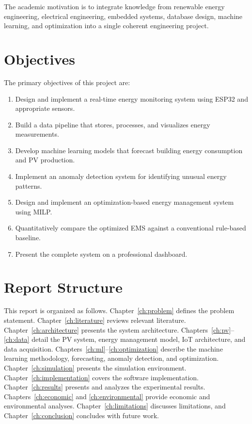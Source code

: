The academic motivation is to integrate knowledge from renewable energy engineering, electrical engineering, embedded systems, database design, machine learning, and optimization into a single coherent engineering project.

\section{Objectives}

The primary objectives of this project are:

\begin{enumerate}
    \item Design and implement a real-time energy monitoring system using ESP32 and appropriate sensors.
    \item Build a data pipeline that stores, processes, and visualizes energy measurements.
    \item Develop machine learning models that forecast building energy consumption and PV production.
    \item Implement an anomaly detection system for identifying unusual energy patterns.
    \item Design and implement an optimization-based energy management system using MILP.
    \item Quantitatively compare the optimized EMS against a conventional rule-based baseline.
    \item Present the complete system on a professional dashboard.
\end{enumerate}

\section{Report Structure}

This report is organized as follows. Chapter~\ref{ch:problem} defines the problem statement. Chapter~\ref{ch:literature} reviews relevant literature. Chapter~\ref{ch:architecture} presents the system architecture. Chapters~\ref{ch:pv}--\ref{ch:data} detail the PV system, energy management model, IoT architecture, and data acquisition. Chapters~\ref{ch:ml}--\ref{ch:optimization} describe the machine learning methodology, forecasting, anomaly detection, and optimization. Chapter~\ref{ch:simulation} presents the simulation environment. Chapter~\ref{ch:implementation} covers the software implementation. Chapter~\ref{ch:results} presents and analyzes the experimental results. Chapters~\ref{ch:economic} and \ref{ch:environmental} provide economic and environmental analyses. Chapter~\ref{ch:limitations} discusses limitations, and Chapter~\ref{ch:conclusion} concludes with future work.
